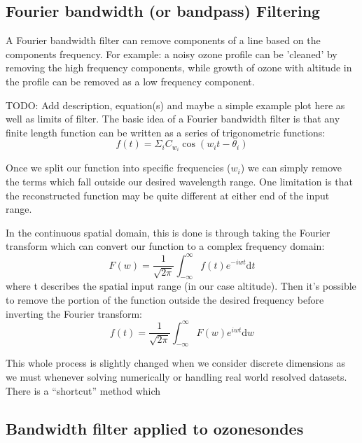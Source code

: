   \subsection{Fourier bandwidth (or bandpass) Filtering}
    \label{ch_o3:sec:bandpassfilter}
    A Fourier bandwidth filter can remove components of a line based on the components frequency. 
    For example: a noisy ozone profile can be ’cleaned’ by removing the high frequency components, while growth of ozone with altitude in the profile can be removed as a low frequency component. 
    
    TODO: Add description, equation(s) and maybe a simple example plot here as well as limits of filter.
    The basic idea of a Fourier bandwidth filter is that any finite length function can be written as a series of trigonometric functions:
    \begin{equation} \label{ch_o3:eqn:FourierSeries}
      f(t) = \Sigma_i C_{w_i} \cos \left( w_i t - \theta_i \right)
    \end{equation}
    
    Once we split our function into specific frequencies ($w_i$) we can simply remove the terms which fall outside our desired wavelength range.
    One limitation is that the reconstructed function may be quite different at either end of the input range.
    
    In the continuous spatial domain, this is done is through taking the Fourier transform which can convert our function to a complex frequency domain:
    \begin{equation*}
      F(w) = \frac{1}{\sqrt{2\pi}}\int_{-\infty}^{\infty}{ f(t) e^{-iwt} \mathrm{d}t }
    \end{equation*}
    where t describes the spatial input range (in our case altitude).
    Then it's possible to remove the portion of the function outside the desired frequency before inverting the Fourier transform:
    \begin{equation*}
      f(t) = \frac{1}{\sqrt{2\pi}}\int_{-\infty}^{\infty}{ F(w) e^{iwt} \mathrm{d}w }
    \end{equation*}
    
    This whole process is slightly changed when we consider discrete dimensions as we must whenever solving numerically or handling real world resolved datasets.
    There is a ``shortcut'' method which 
    
    
  \subsection{Bandwidth filter applied to ozonesondes}
    
